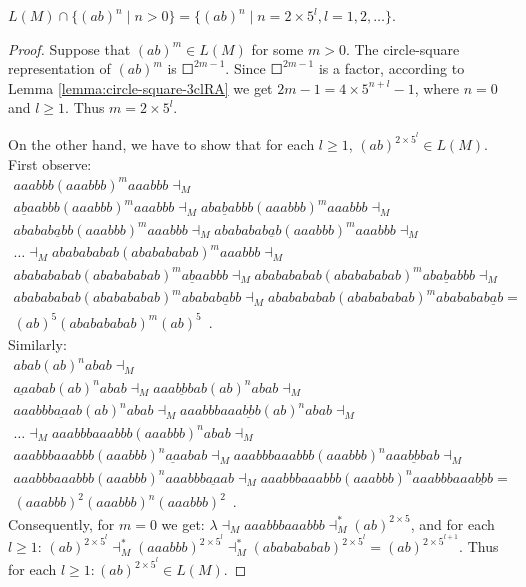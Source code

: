 \begin{lemma}
$L(M) \cap \{(ab)^n \mid n > 0\} = \{(ab)^n \mid n = 2 \times 5^l, l = 1, 2, \ldots \}$.
\end{lemma}

\begin{proof}
Suppose that $(ab)^m \in L(M)$ for some $m > 0$. The circle-square representation of $(ab)^m$ is $\Square^{2m - 1}$. Since $\Square^{2m - 1}$ is a factor, according to Lemma \ref{lemma:circle-square-3clRA} we get $2m - 1 = 4 \times 5^{n+l} - 1$, where $n = 0$ and $l \ge 1$. Thus $m = 2 \times 5^l$.

On the other hand, we have to show that for each $l \ge 1$, $(ab)^{2 \times 5^l} \in L(M)$. First observe:
$$
\begin{array}{l}
aaabbb (aaabbb)^m aaabbb \dashv_M\\
a\underline{b}aabbb (aaabbb)^m aaabbb \dashv_M
aba\underline{b}abbb (aaabbb)^m aaabbb \dashv_M\\
ababab\underline{a}bb (aaabbb)^m aaabbb \dashv_M
abababab\underline{a}b (aaabbb)^m aaabbb \dashv_M\\
\ldots \dashv_M ababababab (ababababab)^m aaabbb \dashv_M\\
ababababab (ababababab)^m a\underline{b}aabbb \dashv_M
ababababab (ababababab)^m aba\underline{b}abbb \dashv_M\\
ababababab (ababababab)^m ababab\underline{a}bb \dashv_M
ababababab (ababababab)^m abababab\underline{a}b = \\
(ab)^5 (ababababab)^m (ab)^5\enspace.
\end{array}
$$
Similarly:
$$
\begin{array}{l}
abab (ab)^n abab \dashv_M\\
\underline{aa}abab (ab)^n abab \dashv_M
aaa\underline{bb}bab (ab)^n abab \dashv_M\\
aaabbb\underline{aa}ab (ab)^n abab \dashv_M
aaabbbaaa\underline{bb}b (ab)^n abab \dashv_M\\
\ldots \dashv_M aaabbbaaabbb (aaabbb)^n abab \dashv_M\\
aaabbbaaabbb (aaabbb)^n \underline{aa}abab \dashv_M
aaabbbaaabbb (aaabbb)^n aaa\underline{bb}bab \dashv_M\\
aaabbbaaabbb (aaabbb)^n aaabbb\underline{aa}ab \dashv_M
aaabbbaaabbb (aaabbb)^n aaabbbaaa\underline{bb}b = \\
(aaabbb)^2 (aaabbb)^n (aaabbb)^2\enspace.
\end{array}
$$
Consequently, for $m = 0$ we get: $\lambda \dashv_M aaabbbaaabbb \dashv_M^* (ab)^{2 \times 5}$, and for each $l \ge 1$: $(ab)^{2 \times 5^l} \dashv_M^* (aaabbb)^{2 \times 5^l} \dashv_M^* (ababababab)^{2 \times 5^l} = (ab)^{2 \times 5^{l+1}}$. Thus for each $l \ge 1: (ab)^{2 \times 5^l} \in L(M)$.
\end{proof}

